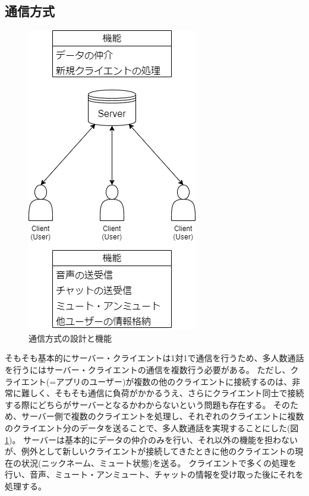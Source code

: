 \documentclass[a4paper]{ltjsarticle}
\begin{document}
\subsection{通信方式}
\begin{figure}[htbp]
    \centering
    \includegraphics[width=0.8\columnwidth]{./images/server_client.png}
    \caption{通信方式の設計と機能}
    \label{fig:server_client}
\end{figure}
そもそも基本的にサーバー・クライエントは1対1で通信を行うため、多人数通話を行うにはサーバー・クライエントの通信を複数行う必要がある。
ただし、クライエント(=アプリのユーザー)が複数の他のクライエントに接続するのは、非常に難しく、そもそも通信に負荷がかかるうえ、さらにクライエント同士で接続する際にどちらがサーバーとなるかわからないという問題も存在する。
そのため、サーバー側で複数のクライエントを処理し、それぞれのクライエントに複数のクライエント分のデータを送ることで、多人数通話を実現することにした(図\ref{fig:server_client})。
サーバーは基本的にデータの仲介のみを行い、それ以外の機能を担わないが、例外として新しいクライエントが接続してきたときに他のクライエントの現在の状況(ニックネーム、ミュート状態)を送る。
クライエントで多くの処理を行い、音声、ミュート・アンミュート、チャットの情報を受け取った後にそれを処理する。
\end{document}
